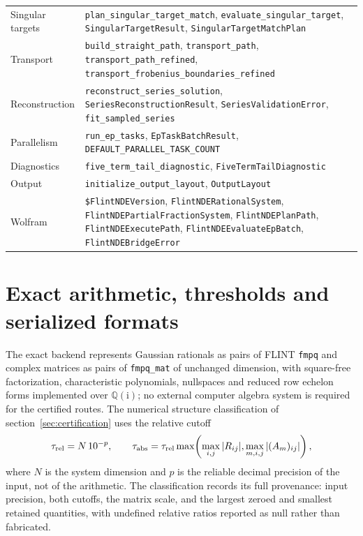 \documentclass[11pt,a4paper]{article}
\newcommand{\ii}{\mathrm i}
\begin{document}
\begin{table}[!ht]
\begin{tabular}{@{}l>{\raggedright\arraybackslash}p{}@{}}
Singular targets & \texttt{plan\_singular\_target\_match},
\texttt{evaluate\_singular\_target}, \texttt{SingularTargetResult},
\texttt{SingularTargetMatchPlan}\\
Transport & \texttt{build\_straight\_path}, \texttt{transport\_path},
\texttt{transport\_path\_refined}, \texttt{transport\_frobenius\_boundaries\_refined}\\
Reconstruction & \texttt{reconstruct\_series\_solution},
\texttt{SeriesReconstructionResult}, \texttt{SeriesValidationError},
\texttt{fit\_sampled\_series}\\
Parallelism & \texttt{run\_ep\_tasks}, \texttt{EpTaskBatchResult},
\texttt{DEFAULT\_PARALLEL\_TASK\_COUNT}\\
Diagnostics & \texttt{five\_term\_tail\_diagnostic},
\texttt{FiveTermTailDiagnostic}\\
Output & \texttt{initialize\_output\_layout}, \texttt{OutputLayout}\\
Wolfram & \texttt{\$FlintNDEVersion}, \texttt{FlintNDERationalSystem},
\texttt{FlintNDEPartialFractionSystem}, \texttt{FlintNDEPlanPath},
\texttt{FlintNDEExecutePath}, \texttt{FlintNDEEvaluateEpBatch},
\texttt{FlintNDEBridgeError}\\
\bottomrule
\end{tabular}
\end{table}

\section{Exact arithmetic, thresholds and serialized formats}
\label{app:exact}

The exact backend represents Gaussian rationals as pairs of FLINT \texttt{fmpq} and
complex matrices as pairs of \texttt{fmpq\_mat} of unchanged dimension, with square-free
factorization, characteristic polynomials, nullspaces and reduced row echelon forms
implemented over $\mathbb Q(\ii)$; no external computer algebra system is required for the
certified routes. The numerical structure classification of section~\ref{sec:certification}
uses the relative cutoff
\begin{equation}
  \tau_{\rm rel}=N\,10^{-p},\qquad
  \tau_{\rm abs}=\tau_{\rm rel}\max\!\left(\max_{i,j}|R_{ij}|,\max_{m,i,j}|(A_m)_{ij}|\right),
  \label{eq:numerical-log-threshold}
\end{equation}
where $N$ is the system dimension and $p$ is the reliable decimal precision of the input,
not of the arithmetic. The classification records its full provenance: input precision,
both cutoffs, the matrix scale, and the largest zeroed and smallest retained quantities,
with undefined relative ratios reported as null rather than fabricated.
\end{document}
